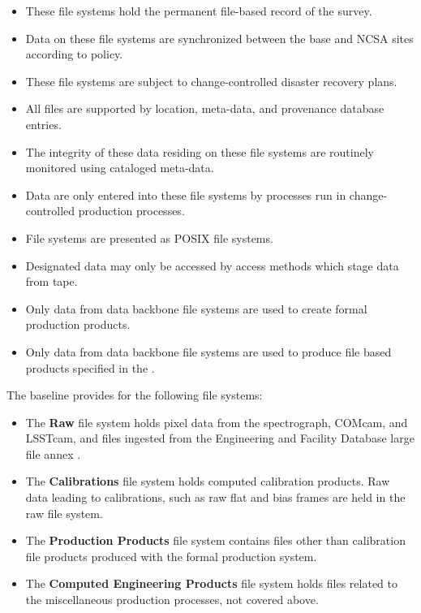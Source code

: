 \documentclass[toc,DM]{lsstdoc}
\begin{document}
\begin{itemize}
\item
  These file systems hold the permanent file-based record of the survey.
\item
  Data on these file systems are synchronized between the base and NCSA
  sites according to policy.
\item
  These file systems are subject to change-controlled disaster recovery
  plans.
\item
  All files are supported by location, meta-data, and provenance
  database entries.
\item
  The integrity of these data residing on these file systems are
  routinely monitored using cataloged meta-data.
\item
  Data are only entered into these file systems by processes run in
  change-controlled production processes.
\item
  File systems are presented as POSIX file systems.
\item
  Designated data may only be accessed by access methods which stage
  data from tape.
\item
  Only data from data backbone file systems are used to create formal
  production products.
\item
  Only data from data backbone file systems are used to produce file based
  products specified in the \DPDD.
\end{itemize}

The baseline provides for the following file systems:

\begin{itemize}
\item The \textbf{Raw} file system holds pixel data from the spectrograph,
COMcam, and LSSTcam, and files ingested from the Engineering and Facility
Database large file annex .

\item The \textbf{Calibrations} file system holds computed calibration
products. Raw data leading to calibrations, such as raw flat and bias
frames are held in the raw file system.

\item The \textbf{Production Products} file system contains files other than
calibration file products produced with the formal production system.

\item The \textbf{Computed Engineering Products} file system holds files
related to the miscellaneous production processes, not covered above.
\end{itemize}


\end{document}
